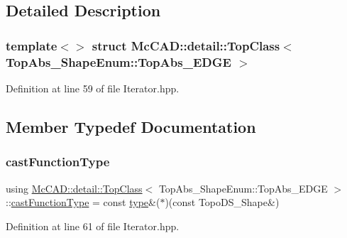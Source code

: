 \subsection{Detailed Description}
\subsubsection*{template$<$$>$\newline
struct Mc\+C\+A\+D\+::detail\+::\+Top\+Class$<$ Top\+Abs\+\_\+\+Shape\+Enum\+::\+Top\+Abs\+\_\+\+E\+D\+G\+E $>$}



Definition at line 59 of file Iterator.\+hpp.



\subsection{Member Typedef Documentation}
\mbox{\label{structMcCAD_1_1detail_1_1TopClass_3_01TopAbs__ShapeEnum_1_1TopAbs__EDGE_01_4_a692e71e44ee1f17df116b0a80675aec2}} 
\subsubsection{\texorpdfstring{cast\+Function\+Type}{castFunctionType}}
{\footnotesize\ttfamily using \hyperlink{structMcCAD_1_1detail_1_1TopClass}{Mc\+C\+A\+D\+::detail\+::\+Top\+Class}$<$ Top\+Abs\+\_\+\+Shape\+Enum\+::\+Top\+Abs\+\_\+\+E\+D\+GE $>$\+::\hyperlink{structMcCAD_1_1detail_1_1TopClass_3_01TopAbs__ShapeEnum_1_1TopAbs__EDGE_01_4_a692e71e44ee1f17df116b0a80675aec2}{cast\+Function\+Type} =  const \hyperlink{structMcCAD_1_1detail_1_1TopClass_3_01TopAbs__ShapeEnum_1_1TopAbs__EDGE_01_4_af60bbd5885a56b23758c4f5bf62c825c}{type}\&($\ast$)(const Topo\+D\+S\+\_\+\+Shape\&)}



Definition at line 61 of file Iterator.\+hpp.

